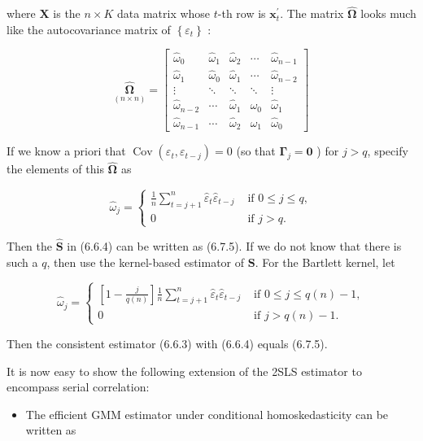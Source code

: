 \documentclass[10pt]{article}
\begin{document}
where $\mathbf{X}$ is the $n \times K$ data matrix whose $t$-th row is $\mathbf{x}_{t}^{\prime}$. The matrix $\widehat{\boldsymbol{\Omega}}$ looks much like the autocovariance matrix of $\left\{\varepsilon_{t}\right\}$ :

\[
\underset{(n \times n)}{\widehat{\boldsymbol{\Omega}}}=\left[\begin{array}{ccccc}
\hat{\omega}_{0} & \hat{\omega}_{1} & \hat{\omega}_{2} & \cdots & \hat{\omega}_{n-1}  \tag{6.7.6}\\
\hat{\omega}_{1} & \hat{\omega}_{0} & \hat{\omega}_{1} & \cdots & \hat{\omega}_{n-2} \\
\vdots & \ddots & \ddots & \ddots & \vdots \\
\hat{\omega}_{n-2} & \cdots & \hat{\omega}_{1} & \hat{\omega}_{0} & \hat{\omega}_{1} \\
\hat{\omega}_{n-1} & \cdots & \hat{\omega}_{2} & \hat{\omega}_{1} & \hat{\omega}_{0}
\end{array}\right]
\]

If we know a priori that $\operatorname{Cov}\left(\varepsilon_{t}, \varepsilon_{t-j}\right)=0$ (so that $\boldsymbol{\Gamma}_{j}=\mathbf{0}$ ) for $j>q$, specify the elements of this $\widehat{\boldsymbol{\Omega}}$ as

\[
\hat{\omega}_{j}= \begin{cases}\frac{1}{n} \sum_{t=j+1}^{n} \hat{\varepsilon}_{t} \hat{\varepsilon}_{t-j} & \text { if } 0 \leq j \leq q,  \tag{6.7.7}\\ 0 & \text { if } j>q .\end{cases}
\]

Then the $\widehat{\mathbf{S}}$ in (6.6.4) can be written as (6.7.5). If we do not know that there is such a $q$, then use the kernel-based estimator of $\mathbf{S}$. For the Bartlett kernel, let

\[
\hat{\omega}_{j}= \begin{cases}{\left[1-\frac{j}{q(n)}\right] \frac{1}{n} \sum_{t=j+1}^{n} \hat{\varepsilon}_{t} \hat{\varepsilon}_{t-j}} & \text { if } 0 \leq j \leq q(n)-1,  \tag{6.7.8}\\ 0 & \text { if } j>q(n)-1 .\end{cases}
\]

Then the consistent estimator (6.6.3) with (6.6.4) equals (6.7.5).

It is now easy to show the following extension of the 2SLS estimator to encompass serial correlation:

\begin{itemize}
  \item The efficient GMM estimator under conditional homoskedasticity can be written as
\end{itemize}
\end{document}
